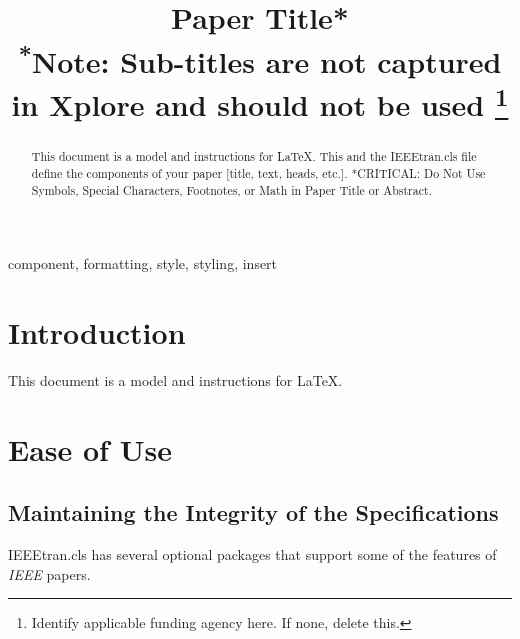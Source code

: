 \documentclass[conference]{IEEEtran}
\begin{document}
\title{Paper Title*\\
{\footnotesize \textsuperscript{*}Note: Sub-titles are not captured in Xplore and
should not be used}
\thanks{Identify applicable funding agency here. If none, delete this.}
}

\author{
    \and
}

\maketitle

\begin{abstract}
This document is a model and instructions for \LaTeX.
This and the IEEEtran.cls file define the components of your paper [title, text, heads, etc.].
*CRITICAL: Do Not Use Symbols, Special Characters, Footnotes,
or Math in Paper Title or Abstract.
\end{abstract}

\begin{IEEEkeywords}
component, formatting, style, styling, insert
\end{IEEEkeywords}

\section{Introduction}
This document is a model and instructions for \LaTeX.

\section{Ease of Use}
\subsection{Maintaining the Integrity of the Specifications}
IEEEtran.cls has several optional packages that support some of the
features of \textit{IEEE} papers.
\end{document}
